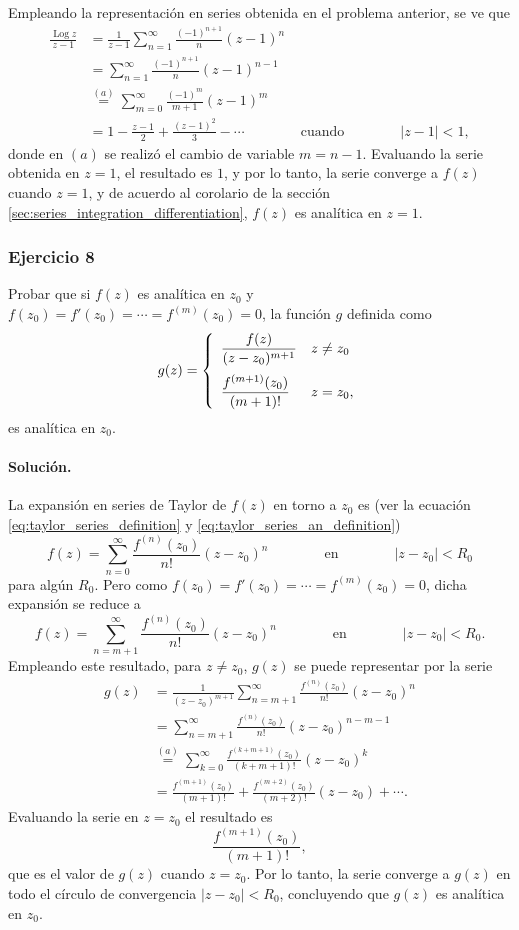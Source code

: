 \documentclass[a4paper]{report}
\DeclareMathOperator{\Log}{Log}
\begin{document}
Empleando la representación en series obtenida en el problema anterior, se ve que
\begin{align*}
 \frac{\Log z}{z-1}&=\frac{1}{z-1}\sum_{n=1}^\infty\frac{(-1)^{n+1}}{n}(z-1)^n\\
  &=\sum_{n=1}^\infty\frac{(-1)^{n+1}}{n}(z-1)^{n-1}\\ 
  &\overset{(a)}{=}\sum_{m=0}^\infty\frac{(-1)^m}{m+1}(z-1)^m\\
  &=1-\frac{z-1}{2}+\frac{(z-1)^2}{3}-\cdots
  \qquad\qquad\textrm{cuando}\qquad\qquad
 |z-1|<1,
\end{align*}
donde en \((a)\) se realizó el cambio de variable \(m=n-1\). Evaluando la serie obtenida en \(z=1\), el resultado es \(1\), y por lo tanto, la serie converge a \(f(z)\) cuando \(z=1\), y de acuerdo al corolario de la sección \ref{sec:series_integration_differentiation}, \(f(z)\) es analítica en \(z=1\).

\subsubsection*{Ejercicio 8}

Probar que si \(f(z)\) es analítica en \(z_0\) y \(f(z_0)=f'(z_0)=\cdots=f^{(m)}(z_0)=0\), la función \(g\) definida como
\[
 g(z)=
 \left\{ 
 \begin{array}{ll}
  \dfrac{f(z)}{(z-z_0)^{m+1}} & z\neq z_0\\[\bigskipamount]
  \dfrac{f^{(m+1)}(z_0)}{(m+1)!}&  z=z_0,
 \end{array}
 \right.
\]
es analítica en \(z_0\).

\paragraph{Solución.} La expansión en series de Taylor de \(f(z)\) en torno a \(z_0\) es (ver la ecuación \ref{eq:taylor_series_definition} y \ref{eq:taylor_series_an_definition})
\[
 f(z)=\sum_{n=0}^\infty\frac{f^{(n)}(z_0)}{n!}(z-z_0)^n
 \qquad\qquad\textrm{en}\qquad\qquad
 |z-z_0|<R_0
\]
para algún \(R_0\). Pero como \(f(z_0)=f'(z_0)=\cdots=f^{(m)}(z_0)=0\), dicha expansión se reduce a 
\[
 f(z)=\sum_{n=m+1}^\infty\frac{f^{(n)}(z_0)}{n!}(z-z_0)^n
 \qquad\qquad\textrm{en}\qquad\qquad
 |z-z_0|<R_0.
\]
Empleando este resultado, para \(z\neq z_0\), \(g(z)\) se puede representar por la serie
\begin{align*}
 g(z)&=\frac{1}{(z-z_0)^{m+1}}\sum_{n=m+1}^\infty\frac{f^{(n)}(z_0)}{n!}(z-z_0)^n\\
   &=\sum_{n=m+1}^\infty\frac{f^{(n)}(z_0)}{n!}(z-z_0)^{n-m-1}\\
   &\overset{(a)}{=}\sum_{k=0}^\infty\frac{f^{(k+m+1)}(z_0)}{(k+m+1)!}(z-z_0)^k\\
   &=\frac{f^{(m+1)}(z_0)}{(m+1)!}+\frac{f^{(m+2)}(z_0)}{(m+2)!}(z-z_0)+\cdots.
\end{align*}
Evaluando la serie en \(z=z_0\) el resultado es
\[
 \frac{f^{(m+1)}(z_0)}{(m+1)!},
\]
que es el valor de \(g(z)\) cuando \(z=z_0\). Por lo tanto, la serie converge a \(g(z)\) en todo el círculo de convergencia \(|z-z_0|<R_0\), concluyendo que \(g(z)\) es analítica en \(z_0\).
\end{document}
